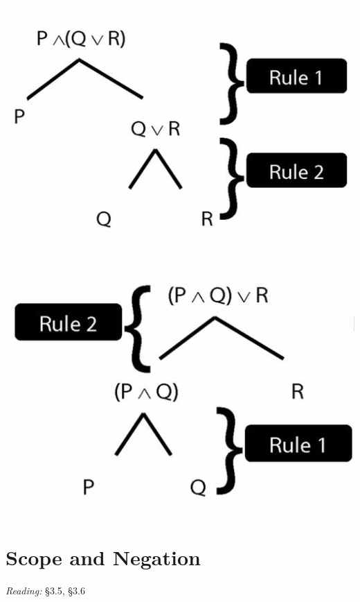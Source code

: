 \documentclass[12pt]{extarticle}
\begin{document}
\begin{multicols*}{3}
\begin{center}
\includegraphics[scale=0.3]{img/unit_292_fig1.png}
\end{center}
\begin{center}
\includegraphics[scale=0.3]{img/unit_292_fig2.png}
\end{center}
 
 
 
\vfill
\columnbreak

\section{Scope and Negation}
 
\emph{Reading:} §3.5, §3.6
 

\end{multicols*}
\end{document}
